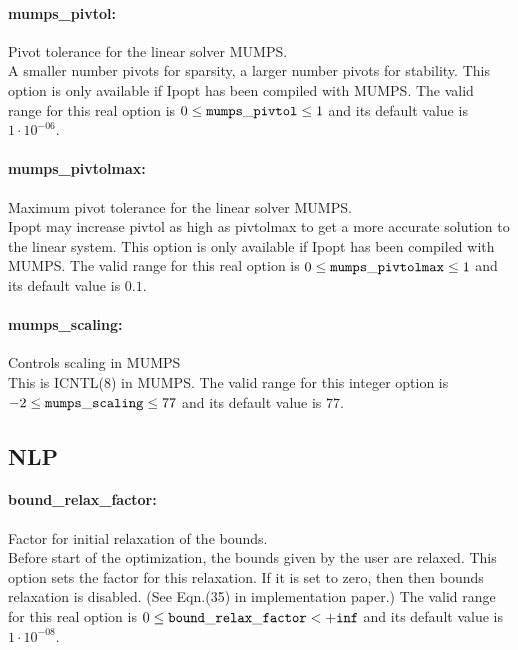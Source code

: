 \paragraph{mumps\_pivtol:}\label{opt:mumps_pivtol} Pivot tolerance for the linear solver MUMPS. \\
 A smaller number pivots for sparsity, a larger number pivots for stability.  This option is only available if Ipopt has been compiled with MUMPS. The valid range for this real option is 
$0 \le {\tt mumps\_pivtol } \le 1$
and its default value is $1 \cdot 10^{-06}$.


\paragraph{mumps\_pivtolmax:}\label{opt:mumps_pivtolmax} Maximum pivot tolerance for the linear solver MUMPS. \\
 Ipopt may increase pivtol as high as pivtolmax to get a more accurate solution to the linear system.  This option is only available if Ipopt has been compiled with MUMPS. The valid range for this real option is 
$0 \le {\tt mumps\_pivtolmax } \le 1$
and its default value is $0.1$.


\paragraph{mumps\_scaling:}\label{opt:mumps_scaling} Controls scaling in MUMPS \\
 This is ICNTL(8) in MUMPS. The valid range for this integer option is
$-2 \le {\tt mumps\_scaling } \le 77$
and its default value is $77$.


\subsection{NLP}
\label{sec:NLP}
\paragraph{bound\_relax\_factor:}\label{opt:bound_relax_factor} Factor for initial relaxation of the bounds. \\
 Before start of the optimization, the bounds given by the user are relaxed.  This option sets the factor for this relaxation.  If it is set to zero, then then bounds relaxation is disabled. (See Eqn.(35) in implementation paper.) The valid range for this real option is 
$0 \le {\tt bound\_relax\_factor } <  {\tt +inf}$
and its default value is $1 \cdot 10^{-08}$.


